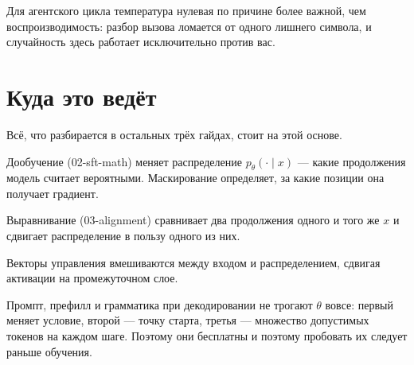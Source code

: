 \documentclass[11pt,a4paper]{article}
\begin{document}
Для агентского цикла температура нулевая по причине более важной, чем
воспроизводимость: разбор вызова ломается от одного лишнего символа,
и случайность здесь работает исключительно против вас.

\section{Куда это ведёт}

Всё, что разбирается в остальных трёх гайдах, стоит на этой основе.

Дообучение (\hbox{02-sft-math}) меняет распределение
$p_\theta(\cdot\mid x)$ — какие продолжения модель считает вероятными.
Маскирование определяет, за какие позиции она получает градиент.

Выравнивание (\hbox{03-alignment}) сравнивает два продолжения одного
и того же $x$ и сдвигает распределение в пользу одного из них.

Векторы управления вмешиваются между входом и распределением, сдвигая
активации на промежуточном слое.

Промпт, префилл и грамматика при декодировании не трогают $\theta$
вовсе: первый меняет условие, второй — точку старта, третья — множество
допустимых токенов на каждом шаге. Поэтому они бесплатны и поэтому
пробовать их следует раньше обучения.
\end{document}
